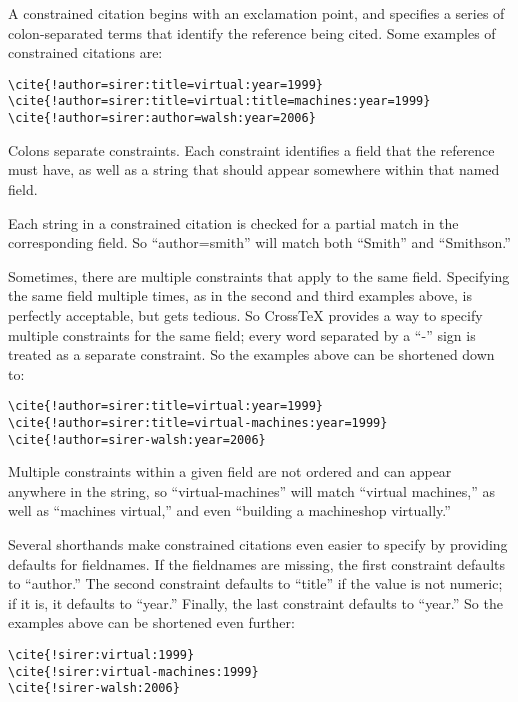 \documentclass{article}
\newcommand{\XTX}{Cross\TeX}
\begin{document}
A constrained citation begins with an exclamation point, and specifies
a series of colon-separated terms that identify the reference being
cited. Some examples of constrained citations are:

\begin{small}\begin{verbatim}
\cite{!author=sirer:title=virtual:year=1999}
\cite{!author=sirer:title=virtual:title=machines:year=1999}
\cite{!author=sirer:author=walsh:year=2006}
\end{verbatim}\end{small}

Colons separate constraints. Each constraint identifies a field that the
reference must have, as well as a string that should appear somewhere
within that named field.

Each string in a constrained citation is checked for a partial match in
the corresponding field. So ``author=smith'' will match both ``Smith''
and ``Smithson.''

Sometimes, there are multiple constraints that apply to the same
field. Specifying the same field multiple times, as in the second and
third examples above, is perfectly acceptable, but gets tedious. So \XTX{}
provides a way to specify multiple constraints for the same field; every
word separated by a ``-'' sign is treated as a separate constraint. So
the examples above can be shortened down to:

\begin{small}\begin{verbatim}
\cite{!author=sirer:title=virtual:year=1999}
\cite{!author=sirer:title=virtual-machines:year=1999}
\cite{!author=sirer-walsh:year=2006}
\end{verbatim}\end{small}

Multiple constraints within a given field are not ordered and can appear
anywhere in the string, so ``virtual-machines'' will match ``virtual
machines,'' as well as ``machines virtual,'' and even ``building a
machineshop virtually.''

Several shorthands make constrained citations even easier to specify by
providing defaults for fieldnames. If the fieldnames are missing, the
first constraint defaults to ``author.'' The second constraint defaults to
``title'' if the value is not numeric; if it is, it defaults to ``year.''
Finally, the last constraint defaults to ``year.'' So the examples above
can be shortened even further:

\begin{small}\begin{verbatim}
\cite{!sirer:virtual:1999}
\cite{!sirer:virtual-machines:1999}
\cite{!sirer-walsh:2006}
\end{verbatim}\end{small}
\end{document}
